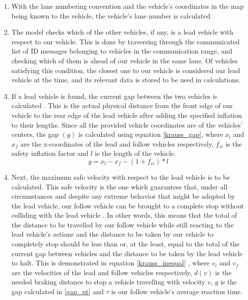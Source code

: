 \begin{enumerate}
    \item With the lane numbering convention and the vehicle’s coordinates in the map being known to the vehicle, the vehicle’s lane number is calculated.
    \item The model checks which of the other vehicles, if any, is a lead vehicle with respect to our vehicle. This is done by traversing through the communicated list of ID messages belonging to vehicles in the communication range, and checking which of them is ahead of our vehicle in the same lane. Of vehicles satisfying this condition, the closest one to our vehicle is considered our lead vehicle at the time, and its relevant data is stored to be used in calculations.
    \item If a lead vehicle is found, the current gap between the two vehicles is calculated \cite{Krau1998MicroscopicMO}. This is the actual physical distance from the front edge of our vehicle to the rear edge of the lead vehicle after adding the specified inflation to their lengths. Since all the provided vehicle coordinates are of the vehicles' centers, the gap \((g)\) is calculated using equation \ref{krauss_gap}, where \(x_l\) and \(x_f\) are the x-coordinates of the lead and follow vehicles respectively, \(f_{si}\) is the safety inflation factor and \(l\) is the length of the vehicle.
    \begin{equation}
        g = x_l - x_f - (1 + f_{si})*l
        \label{krauss_gap}
    \end{equation}
    \label{gap_pt}
    
    \item Next, the maximum safe velocity with respect to the lead vehicle is to be calculated. This safe velocity is the one which guarantees that, under all circumstances and despite any extreme behavior that might be adopted by the lead vehicle, our follow vehicle can be brought to a complete stop without colliding with the lead vehicle \cite{Krau1998MicroscopicMO}. In other words, this means that the total of the distance to be travelled by our follow vehicle while still reacting to the lead vehicle’s actions and the distance to be taken by our vehicle to completely stop should be less than or, at the least, equal to the total of the current gap between vehicles and the distance to be taken by the lead vehicle to halt. This is demonstrated in equation \ref{krauss_inequal} \cite{Krau1998MicroscopicMO}, where \(v_l\) and \(v_f\) are the velocities of the lead and follow vehicles respectively, \(d(v)\) is the needed braking distance to stop a vehicle travelling with velocity \(v\), \(g\) is the gap calculated in \ref{gap_pt} and \(\tau\) is our follow vehicle’s average reaction time.
    

\end{enumerate}
